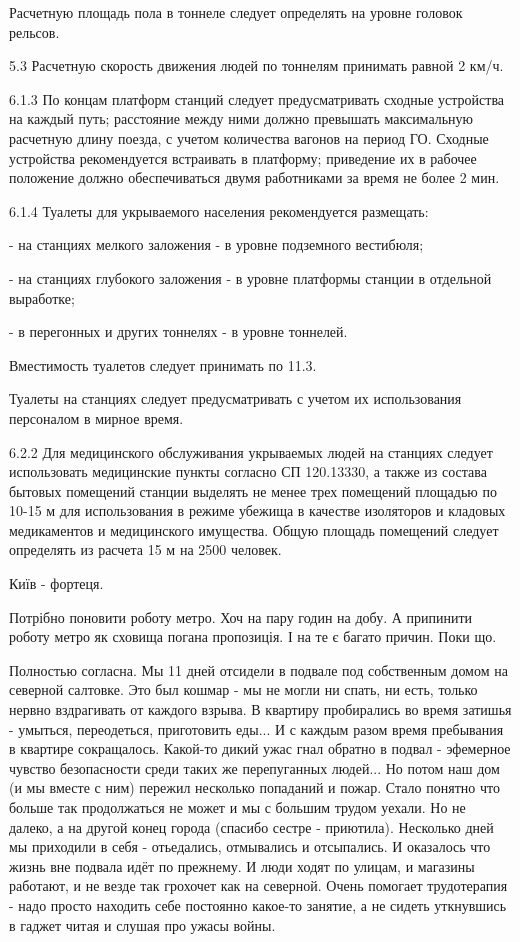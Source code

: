 \begin{itemize}
Расчетную площадь пола в тоннеле следует определять на уровне головок рельсов.

5.3 Расчетную скорость движения людей по тоннелям принимать равной 2 км/ч.

6.1.3 По концам платформ станций следует предусматривать сходные устройства на
каждый путь; расстояние между ними должно превышать максимальную расчетную
длину поезда, с учетом количества вагонов на период ГО. Сходные устройства
рекомендуется встраивать в платформу; приведение их в рабочее положение должно
обеспечиваться двумя работниками за время не более 2 мин.

6.1.4 Туалеты для укрываемого населения рекомендуется размещать:

- на станциях мелкого заложения - в уровне подземного вестибюля;

- на станциях глубокого заложения - в уровне платформы станции в отдельной
выработке;

- в перегонных и других тоннелях - в уровне тоннелей.

Вместимость туалетов следует принимать по 11.3.

Туалеты на станциях следует предусматривать с учетом их использования
персоналом в мирное время.

6.2.2 Для медицинского обслуживания укрываемых людей на станциях следует
использовать медицинские пункты согласно СП 120.13330, а также из состава
бытовых помещений станции выделять не менее трех помещений площадью по 10-15 м
для использования в режиме убежища в качестве изоляторов и кладовых
медикаментов и медицинского имущества. Общую площадь помещений следует
определять из расчета 15 м на 2500 человек.

Київ - фортеця.


Потрібно поновити роботу метро. Хоч на пару годин на добу. А припинити роботу
метро як сховища погана пропозиція. І на те є багато причин. Поки що.


Полностью согласна. Мы 11 дней отсидели в подвале под собственным домом на
северной салтовке. Это был кошмар - мы не могли ни спать, ни есть, только
нервно вздрагивать от каждого взрыва. В квартиру пробирались во время затишья -
умыться, переодеться, приготовить еды... И с каждым разом время пребывания в
квартире сокращалось. Какой-то дикий ужас гнал обратно в подвал - эфемерное
чувство безопасности среди таких же перепуганных людей... Но потом наш дом (и
мы вместе с ним) пережил несколько попаданий и пожар. Стало понятно что больше
так продолжаться не может и мы с большим трудом уехали. Но не далеко, а на
другой конец города (спасибо сестре - приютила). Несколько дней мы приходили в
себя - отьедались, отмывались и отсыпались. И оказалось что жизнь вне подвала
идёт по прежнему. И люди ходят по улицам, и магазины работают, и не везде так
грохочет как на северной. Очень помогает трудотерапия - надо просто находить
себе постоянно какое-то занятие, а не сидеть уткнувшись в гаджет читая и слушая
про ужасы войны.  


\end{itemize}
